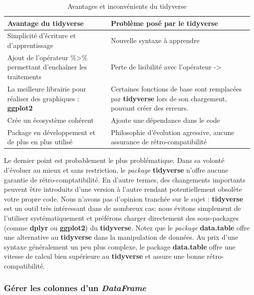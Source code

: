 \documentclass[
  11pt,
  french,
]{book}
\begin{document}
\begin{table}

\caption{\label{tab:tableTidyverse}Avantages et inconvénients du tidyverse}
\centering
\fontsize{8}{10}\selectfont
\begin{tabular}[t]{>{\raggedright\arraybackslash}p{7cm}>{\raggedright\arraybackslash}p{7cm}}
\toprule
Avantage du tidyverse & Problème posé par le tidyverse\\
\midrule
Simplicité d'écriture et d'apprentissage & Nouvelle syntaxe à apprendre\\
Ajout de l'opérateur \%>\% permettant d'enchaîner les traitements & Perte de lisibilité avec l'opérateur ->\\
La meilleure librairie pour réaliser des graphiques : \textbf{ggplot2} & Certaines fonctions de base sont remplacées par \textbf{tidyverse} lors de son chargement, pouvant créer des erreurs.\\
Crée un écosystème cohérent & Ajoute une dépendance dans le code\\
Package en développement et de plus en plus utilisé & Philosophie d'évolution agressive, aucune assurance de rétro-compatibilité\\
\bottomrule
\end{tabular}
\end{table}

Le dernier point est probablement le plus problématique. Dans sa volonté d'évoluer au mieux et sans restriction, le \emph{package} \textbf{tidyverse} n'offre aucune garantie de rétro-comptatibilité. En d'autre termes, des changements importants peuvent être introduits d'une version à l'autre rendant potentiellement obsolète votre propre code. Nous n'avons pas d'opinion tranchée sur le sujet : \textbf{tidyverse} est un outil très intéressant dans de nombreux cas; nous évitons simplement de l'utiliser systématiquement et préférons charger directement des sous-packages (comme \textbf{dplyr} ou \textbf{ggplot2}) du \textbf{tidyverse}. Notez que le \emph{package} \textbf{data.table} offre une alternative au \textbf{tidyverse} dans la manipulation de données. Au prix d'une syntaxe généralement un peu plus complexe, le package \textbf{data.table} offre une vitesse de calcul bien supérieure au \textbf{tidyverse} et assure une bonne rétro-compatibilité.

\hypertarget{sect01422}{%
\subsubsection{\texorpdfstring{Gérer les colonnes d'un \emph{DataFrame}}{Gérer les colonnes d'un DataFrame}}\label{sect01422}}
\end{document}
